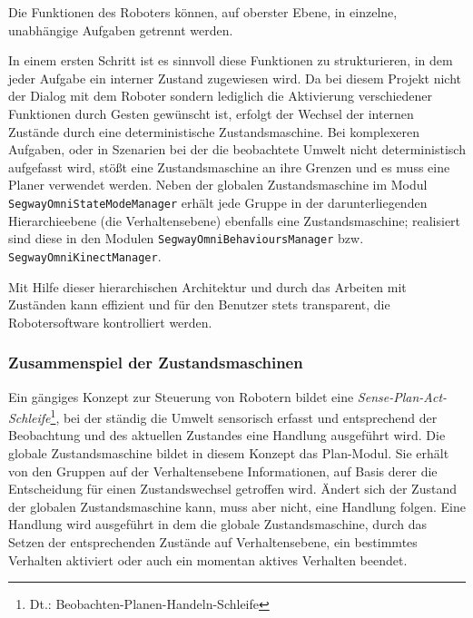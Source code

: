 Die Funktionen des Roboters können, auf oberster Ebene, in einzelne, unabhängige Aufgaben getrennt werden. 

In einem ersten Schritt ist es sinnvoll diese Funktionen zu strukturieren, in dem jeder Aufgabe ein interner Zustand zugewiesen wird. Da bei diesem Projekt nicht der Dialog mit dem Roboter sondern lediglich die Aktivierung verschiedener Funktionen durch Gesten gewünscht ist, erfolgt der Wechsel der internen Zustände durch eine deterministische Zustandsmaschine. Bei komplexeren Aufgaben, oder in Szenarien bei der die beobachtete Umwelt nicht deterministisch aufgefasst wird, stößt eine Zustandsmaschine an ihre Grenzen und es muss eine Planer verwendet werden. Neben der globalen Zustandsmaschine im Modul \lstinline{SegwayOmniStateModeManager} erhält jede Gruppe in der darunterliegenden Hierarchieebene (die Verhaltensebene) ebenfalls eine Zustandsmaschine; realisiert sind diese in den Modulen \lstinline{SegwayOmniBehavioursManager} bzw. \lstinline{SegwayOmniKinectManager}.

Mit Hilfe dieser hierarchischen Architektur und durch das Arbeiten mit Zuständen kann effizient und für den Benutzer stets transparent, die Robotersoftware kontrolliert werden.

\subsubsection{Zusammenspiel der Zustandsmaschinen}
\label{integration_umsetzung_zusammenspiel_sec}

Ein gängiges Konzept zur Steuerung von Robotern bildet eine \textit{Sense-Plan-Act-Schleife}\footnote{Dt.: Beobachten-Planen-Handeln-Schleife}, bei der ständig die Umwelt sensorisch erfasst und entsprechend der Beobachtung und des aktuellen Zustandes eine Handlung ausgeführt wird.
Die globale Zustandsmaschine bildet in diesem Konzept das Plan-Modul. Sie erhält von den Gruppen auf der Verhaltensebene Informationen, auf Basis derer die Entscheidung für einen Zustandswechsel getroffen wird. Ändert sich der Zustand der globalen Zustandsmaschine kann, muss aber nicht, eine Handlung folgen. Eine Handlung wird ausgeführt in dem die globale Zustandsmaschine, durch das Setzen der entsprechenden Zustände auf Verhaltensebene, ein bestimmtes Verhalten aktiviert oder auch ein momentan aktives Verhalten beendet.

